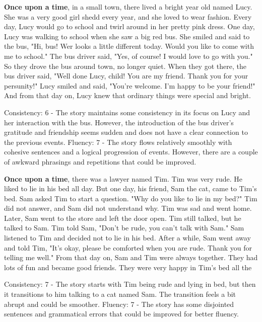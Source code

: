 \documentclass{article}
\begin{document}
\textbf{Once upon a time}, in a small town, there lived a bright year old named Lucy. She was a very good girl shedd every year, and she loved to wear fashion. Every day, Lucy would go to school and twirl around in her pretty pink dress. One day, Lucy was walking to school when she saw a big red bus. She smiled and said to the bus, "Hi, bus! Wer looks a little different today. Would you like to come with me to school." The bus driver said, "Yes, of course! I would love to go with you." So they drove the bus around town, no longer quiet. When they got there, the bus driver said, "Well done Lucy, child! You are my friend. Thank you for your persunity!" Lucy smiled and said, "You're welcome. I'm happy to be your friend!" And from that day on, Lucy knew that ordinary things were special and bright.

Consistency: 6 - The story maintains some consistency in its focus on Lucy and her interaction with the bus. However, the introduction of the bus driver's gratitude and friendship seems sudden and does not have a clear connection to the previous events.
Fluency: 7 - The story flows relatively smoothly with cohesive sentences and a logical progression of events. However, there are a couple of awkward phrasings and repetitions that could be improved.

\textbf{Once upon a time}, there was a lawyer named Tim. Tim was very rude. He liked to lie in his bed all day. But one day, his friend, Sam the cat, came to Tim's bed. Sam asked Tim to start a question. "Why do you like to lie in my bed?" Tim did not answer, and Sam did not understand why. Tim was sad and went home. Later, Sam went to the store and left the door open. Tim still talked, but he talked to Sam. Tim told Sam, "Don't be rude, you can't talk with Sam." Sam listened to Tim and decided not to lie in his bed. After a while, Sam went away and told Tim, "It's okay, please be comforted when you are rude. Thank you for telling me well." From that day on, Sam and Tim were always together. They had lots of fun and became good friends. They were very happy in Tim's bed all the

Consistency: 7 - The story starts with Tim being rude and lying in bed, but then it transitions to him talking to a cat named Sam. The transition feels a bit abrupt and could be smoother.
Fluency: 7 - The story has some disjointed sentences and grammatical errors that could be improved for better fluency.
\end{document}
